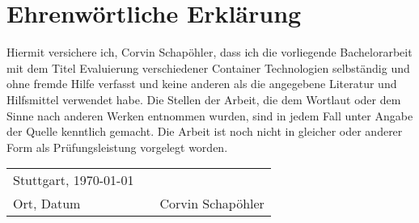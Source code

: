 \chapter{Ehrenwörtliche Erklärung}
\thispagestyle{front}
Hiermit versichere ich, Corvin Schapöhler, dass ich die vorliegende Bachelorarbeit mit dem Titel \glqq Evaluierung verschiedener Container Technologien\grqq{} selbständig und ohne fremde Hilfe verfasst und keine anderen als die angegebene Literatur und Hilfsmittel verwendet habe. Die Stellen der Arbeit, die dem Wortlaut oder dem Sinne nach anderen Werken entnommen wurden, sind in jedem Fall unter Angabe der Quelle kenntlich gemacht. Die Arbeit ist noch nicht in gleicher oder anderer Form als Prüfungsleistung vorgelegt worden.
\vspace{2cm}

\begin{center}
	\begin{tabular}[h]{lp{2cm}p{5.5cm}}
		Stuttgart, \today & & \\
		\cline{1-1}\cline{3-3}
		Ort, Datum& & Corvin Schapöhler\\
	\end{tabular}
\end{center}
